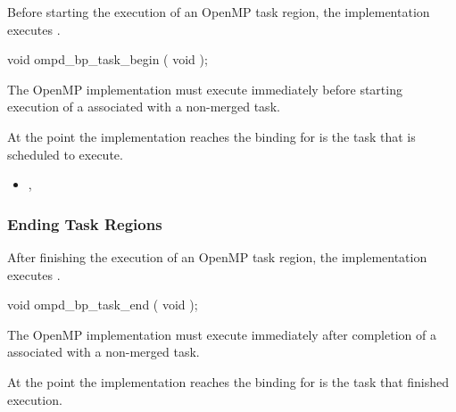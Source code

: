 Before starting the execution of an OpenMP task region, 
the implementation executes .


\format
\begin{cspecific}
\begin{ompSyntax}
void ompd_bp_task_begin ( void );
\end{ompSyntax}
\end{cspecific}


\descr

The OpenMP implementation must execute  immediately
before starting execution of a  associated 
with a non-merged task. %

At the point the implementation reaches 
the binding for 
is the task that is scheduled to execute.

\crossreferences

\begin{itemize}
\item
  , 
\end{itemize}





\subsubsection{Ending Task Regions}
\label{subsubsec:ompd_bp_task_end}

\summary

After finishing the execution of an OpenMP task region, 
the implementation executes .

\format
\begin{cspecific}
\begin{ompSyntax}
void ompd_bp_task_end ( void );
\end{ompSyntax}
\end{cspecific}


\descr

The OpenMP implementation must execute  immediately
after completion of a  associated with a non-merged task.

At the point the implementation reaches 
the binding for 
is the task that finished execution.

